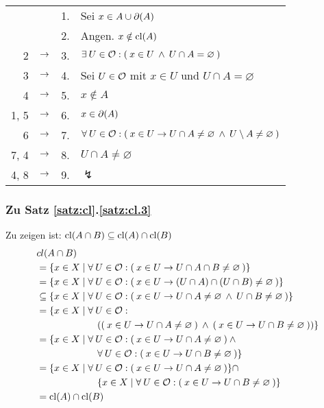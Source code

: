         \begin{longtable}{r c c l}
            & & 1. & Sei $x \in A \cup \partial(A)$ \\
            & & 2. & Angen. $x \notin \text{cl}(A)$ \\
            2 & $\rightarrow$ & 3. & $\exists\: U \in \mathcal{O} : (\: x \in U \:\land\: U \cap A = \varnothing \:)$ \\
            3 & $\rightarrow$ & 4. & Sei $U \in \mathcal{O}$ mit $x \in U$ und $U \cap A = \varnothing$ \\
            4 & $\rightarrow$ & 5. & $x \notin A$ \\
            1, 5 & $\rightarrow$ & 6. & $x \in \partial(A)$ \\
            6 & $\rightarrow$ & 7. & $\forall\: U \in \mathcal{O} : (\: x \in U \to U \cap A \neq \varnothing \:\land\: U \setminus A \neq \varnothing \:)$ \\
            7, 4 & $\rightarrow$ & 8. & $U \cap A \neq \varnothing$ \\
            4, 8 & $\rightarrow$ & 9. & $\lightning$ 
        \end{longtable}	


\subsubsection{Zu Satz \ref{satz:cl}.\ref{satz:cl.3}} 
    Zu zeigen ist: $\text{cl}(A \cap B) \subseteq \text{cl}(A) \cap \text{cl}(B)$ \\
    \begin{align*}
        &cl(A \cap B) \\
        &= \{x \in X \mid \forall\: U \in \mathcal{O} : (\: x \in U \to U \cap A \cap B \neq \varnothing \:) \}\\
        &= \{x \in X \mid \forall\: U \in \mathcal{O} : (\: x \in U \to (U \cap A) \cap (U \cap B) \neq \varnothing \:) \}\\
        &\subseteq \{x \in X \mid \forall\: U \in \mathcal{O} : (\: x \in U \to U \cap A \neq \varnothing \:\land\: U \cap B \neq \varnothing \:) \}\\
        &= \{x \in X \mid \forall\: U \in \mathcal{O} : \\
        &\hphantom{XXXXXXX} ((\: x \in U \to U \cap A \neq \varnothing \:) \:\land\: (\: x \in U \to U \cap B \neq \varnothing \:)) \}\\
        &= \{x \in X \mid \forall\: U \in \mathcal{O} : (\: x \in U \to U \cap A \neq \varnothing \:) \:\land\: \\
        &\hphantom{XXXXXXX} \forall\: U \in \mathcal{O} :  (\: x \in U \to U \cap B \neq \varnothing \:) \}\\
        &= \{x \in X \mid \forall\: U \in \mathcal{O} : (\: x \in U \to U \cap A \neq \varnothing \:) \} \cap \\
        &\hphantom{XXXXXXX} \{x \in X \mid \forall\: U \in \mathcal{O} :  (\: x \in U \to U \cap B \neq \varnothing \:) \}\\
        &= \text{cl}(A) \cap \text{cl}(B)
    \end{align*}


